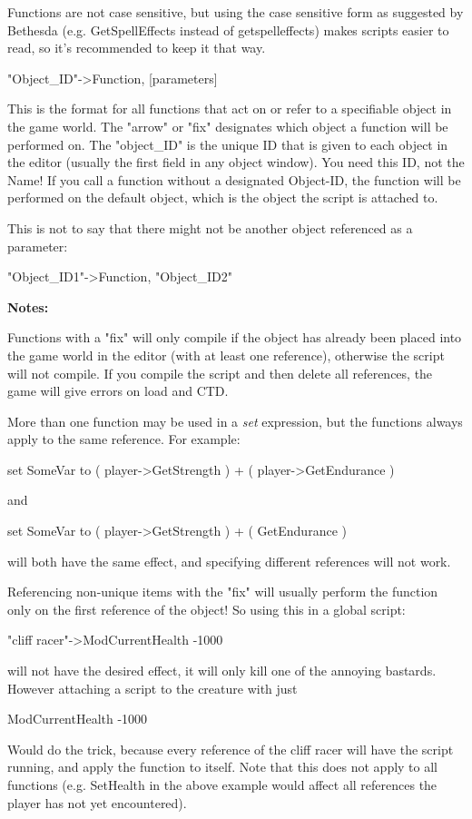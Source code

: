 \documentclass[
]{article}
\begin{document}
Functions are not case sensitive, but using the case sensitive form as
suggested by Bethesda (e.g. GetSpellEffects instead of getspelleffects)
makes scripts easier to read, so it's recommended to keep it that way.

"Object\_ID"-\textgreater Function, {[}parameters{]}

This is the format for all functions that act on or refer to a
specifiable object in the game world. The "arrow" or "fix" designates
which object a function will be performed on. The "object\_ID" is the
unique ID that is given to each object in the editor (usually the first
field in any object window). You need this ID, not the Name! If you call
a function without a designated Object-ID, the function will be
performed on the default object, which is the object the script is
attached to.

This is not to say that there might not be another object referenced as
a parameter:

"Object\_ID1"-\textgreater Function, "Object\_ID2"

\textbf{Notes:}

Functions with a "fix" will only compile if the object has already been
placed into the game world in the editor (with at least one reference),
otherwise the script will not compile. If you compile the script and
then delete all references, the game will give errors on load and CTD.

More than one function may be used in a \emph{set} expression, but the
functions always apply to the same reference. For example:

set SomeVar to ( player-\textgreater GetStrength ) + (
player-\textgreater GetEndurance )

and

set SomeVar to ( player-\textgreater GetStrength ) + ( GetEndurance )

will both have the same effect, and specifying different references will
not work.

Referencing non-unique items with the "fix" will usually perform the
function only on the first reference of the object! So using this in a
global script:

"cliff racer"-\textgreater ModCurrentHealth -1000

will not have the desired effect, it will only kill one of the annoying
bastards. However attaching a script to the creature with just

ModCurrentHealth -1000

Would do the trick, because every reference of the cliff racer will have
the script running, and apply the function to itself. Note that this
does not apply to all functions (e.g. SetHealth in the above example
would affect all references the player has not yet encountered).
\end{document}
